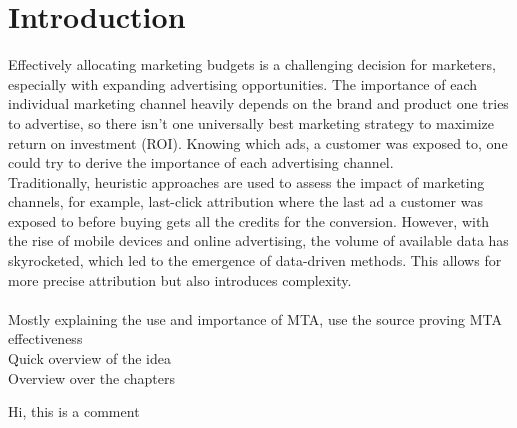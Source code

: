 \chapter{Introduction}
Effectively allocating marketing budgets is a challenging decision for marketers, especially with expanding advertising opportunities. 
The importance of each individual marketing channel heavily depends on the brand and product one tries to advertise, so there isn't one universally best marketing strategy to maximize return on investment (ROI). 
Knowing which ads, a customer was exposed to, one could try to derive the importance of each advertising channel. 
\\ 
Traditionally, heuristic approaches are used to assess the impact of marketing channels, for example, last-click attribution where the last ad a customer was exposed to before buying gets all the credits for the conversion. However, with the rise of mobile devices and online advertising, the volume of available data has skyrocketed, which led to the emergence of data-driven methods. This allows for more precise attribution but also introduces complexity. \\

\\
\color{red}
    Mostly explaining the use and importance of MTA, use the source proving MTA effectiveness \\
    Quick overview of the idea\\
    Overview over the chapters
\color{black}

Hi, this is a comment
